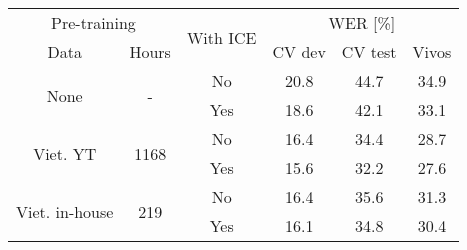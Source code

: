 \begin{table}[!ht]
\captionsetup{font=Large}
\centering
\begin{adjustbox}{width=0.7\columnwidth,center}
\begin{tabular}{|c|c|c|c|c|c|} 
\hline
\multicolumn{2}{|c|}{Pre-training}                      & \multirow{2}{*}{With ICE} & \multicolumn{3}{c|}{WER [\%]}  \\ 
\cline{1-2}\cline{4-6}
Data                            & Hours                 &                           & CV dev & CV test & Vivos       \\ 
\hline
\multirow{2}{*}{None}           & \multirow{2}{*}{-}    & No                        & 20.8   & 44.7    & 34.9        \\ 
\cline{3-6}
                                &                       & Yes                       & 18.6   & 42.1    & 33.1        \\ 
\hline
\multirow{2}{*}{Viet. YT}       & \multirow{2}{*}{1168} & No                        & 16.4   & 34.4    & 28.7        \\ 
\cline{3-6}
                                &                       & Yes                       & 15.6   & 32.2    & 27.6        \\ 
\hline
\multirow{2}{*}{Viet. in-house} & \multirow{2}{*}{219}  & No                        & 16.4   & 35.6    & 31.3        \\ 
\cline{3-6}
                                &                       & Yes                       & 16.1   & 34.8    & 30.4        \\
\hline
\end{tabular}
\end{adjustbox}
\caption{
    }
\label{int_loss_cvvivos_pos}
\end{table}